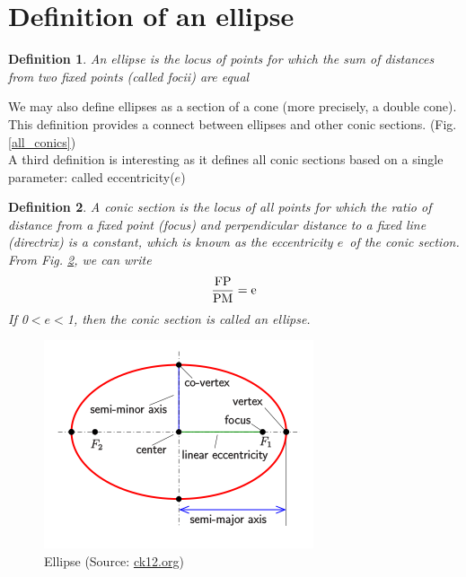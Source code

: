 \documentclass[12pt]{article}
\newtheorem{theorem}{Definition}
\newcommand{\e}{\ensuremath{e}}
\begin{document}
	\section{Definition of an ellipse}
	\begin{theorem}
		An ellipse is the locus of points for which the sum of distances from two fixed points (called \emph{focii}) are equal
	\end{theorem}
	We may also define ellipses as a section of a cone (more precisely, a double cone). This definition provides a connect between ellipses and other conic sections. (Fig. \ref{all_conics}) \\
	A third definition is interesting as it defines all conic sections based on a single parameter: called eccentricity(\e)
	\begin{theorem}
		\label{def_conic}
		A conic section is the locus of all points for which the ratio of distance from a fixed point \emph{(focus)} and perpendicular distance to a fixed line \emph{(directrix)} is a constant, which is known as the eccentricity \e\ of the conic section. From Fig. \ref{def_conic}, we can write
		\begin{equation}
			\rm \frac{FP}{PM} = \e
		\end{equation}
		If {\rm0$<$\e$<$1}, then the conic section is called an \emph{ellipse}.
	\end{theorem}
		\begin{figure}[!h]
		\centering
		\includegraphics{ellipse.png}
		\caption{Ellipse (Source: \href{https://www.ck12.org/book/CK-12-Algebra-II-with-Trigonometry-Concepts/section/10.0/}{ck12.org})}
		\label{ellipse}
	\end{figure}
\end{document}
